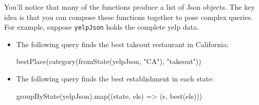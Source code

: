 \noindent You'll notice that many of the functions produce a list of Json
objects. The key idea is that you can compose these functions together to
pose complex queries. For example, suppose \texttt{yelpJson} holds the
complete yelp data.

\begin{itemize}
\item The following query finds the best takeout restaurant in California:
    \begin{scalacode}
    bestPlace(category(fromState(yelpJson, "CA"), "takeout"))
    \end{scalacode}

\item The following query finds the best establishment in each state:
    \begin{scalacode}
    groupByState(yelpJson).map((state, els) => (s, best(els)))
    \end{scalacode}
\end{itemize}


